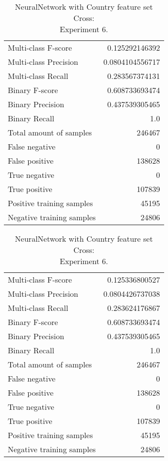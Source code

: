 \begin{table}[H]
\begin{minipage}{0.5\textwidth}
\caption{NeuralNetwork with Country feature set Cross: \\Experiment 5.}
\centering
\begin{tabular}{l r}
\toprule
Multi-class F-score & 0.125292146392 \\
Multi-class Precision & 0.0804104556717 \\
Multi-class Recall & 0.283567374131 \\
\midrule
Binary F-score & 0.608733693474 \\
Binary Precision & 0.437539305465 \\
Binary Recall & 1.0 \\
\midrule
Total amount of samples & 246467 \\
False negative & 0 \\
False positive & 138628 \\
True negative & 0 \\
True positive & 107839 \\
\midrule
Positive training samples & 45195 \\
Negative training samples & 24806 \\
\bottomrule
\end{tabular}
\end{minipage}
\hfillx
\begin{minipage}{0.5\textwidth}
\caption{NeuralNetwork with Country feature set Cross: \\Experiment 6.}
\centering
\begin{tabular}{l r}
\toprule
Multi-class F-score & 0.125336800527 \\
Multi-class Precision & 0.0804426737038 \\
Multi-class Recall & 0.283624176867 \\
\midrule
Binary F-score & 0.608733693474 \\
Binary Precision & 0.437539305465 \\
Binary Recall & 1.0 \\
\midrule
Total amount of samples & 246467 \\
False negative & 0 \\
False positive & 138628 \\
True negative & 0 \\
True positive & 107839 \\
\midrule
Positive training samples & 45195 \\
Negative training samples & 24806 \\
\bottomrule
\end{tabular}
\end{minipage}
\end{table}
